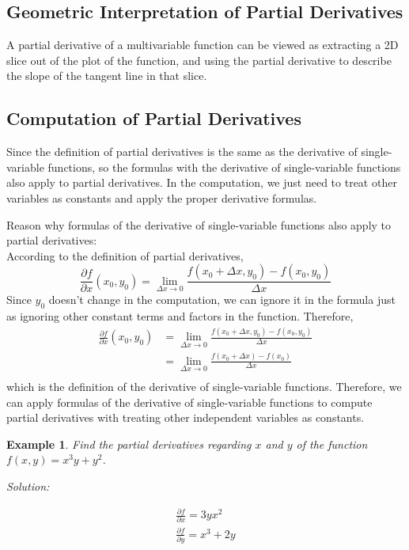 \documentclass{article}
\newtheorem{example}{Example}
\begin{document}
\subsection{Geometric Interpretation of Partial Derivatives}

A partial derivative of a multivariable function can be viewed as extracting a 
2D slice out of the plot of the function, and using the partial derivative to 
describe the slope of the tangent line in that slice.

\subsection{Computation of Partial Derivatives}

Since the definition of partial derivatives is the same as the derivative of 
single-variable functions, so the formulas with the derivative of 
single-variable functions also apply to partial derivatives. In the computation, 
we just need to treat other variables as constants and apply the proper 
derivative formulas.

\bigskip

Reason why formulas of the derivative of single-variable functions also apply to 
partial derivatives: \\
According to the definition of partial derivatives,
\begin{equation*}
  \frac{\partial f}{\partial x}(x_0, y_0) = \lim_{\Delta x \to 0}\frac{f(x_0 + \Delta x, y_0) - f(x_0, y_0)}{\Delta x}
\end{equation*}
Since $y_0$ doesn't change in the computation, we can ignore it in the formula 
just as ignoring other constant terms and factors in the function. Therefore,
\begin{equation*}
\begin{split}
  \frac{\partial f}{\partial x}(x_0, y_0) &= \lim_{\Delta x \to 0}\frac{f(x_0 + \Delta x, y_0) - f(x_0, y_0)}{\Delta x} \\
                                          &= \lim_{\Delta x \to 0}\frac{f(x_0 + \Delta x) - f(x_0)}{\Delta x} \\
\end{split}
\end{equation*}
which is the definition of the derivative of single-variable functions. 
Therefore, we can apply formulas of the derivative of single-variable functions 
to compute partial derivatives with treating other independent variables as 
constants.

\begin{example}
  Find the partial derivatives regarding $x$ and $y$ of the function 
  $f(x, y) = x^3y + y^2$.

  Solution:

  \begin{gather*}
    \frac{\partial f}{\partial x} = 3yx^2 \\
    \frac{\partial f}{\partial y} = x^3 + 2y \\
  \end{gather*}
\end{example}
\end{document}

